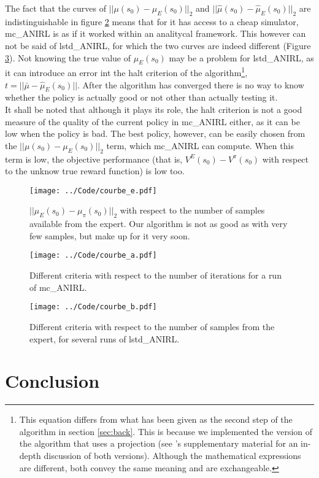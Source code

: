 \documentclass{article}
\begin{document}
The fact that  the curves of  $||\mu(s_0) - \mu_E(s_0)||_2$ and $||\hat\mu(s_0) - \hat\mu_E(s_0)||_2$ are indistinguishable in figure \ref{fig:A} means that for it has access to a cheap simulator, mc\_ANIRL is as if it worked within an analitycal framework. This however can not be said of lstd\_ANIRL, for which the two curves are indeed different (Figure \ref{fig:B}). Not knowing the true value of $\mu_E(s_0)$ may be a problem for lstd\_ANIRL, as it can introduce an error int the halt criterion of the algorithm\footnote{This equation differs from what has been given as the second step of the algorithm in section \ref{sec:back}. This is because we implemented the version of the algorithm that uses a projection (see \citet{abbeel2004apprenticeship}'s supplementary material for an in-depth discussion of both versions). Although the mathematical expressions are different, both convey the same meaning and are exchangeable.}, $t = ||\bar\mu-\hat\mu_E(s_0)||$. After the algorithm has converged there is no way to know whether the policy is actually good or not other than actually testing it.\\

It shall be noted that although it plays its role, the halt criterion is not a good measure of the quality of the current policy in mc\_ANIRL either, as it can be low when the policy is bad. The best policy, however, can be easily chosen from the $||\mu(s_0) - \mu_E(s_0)||_2$ term, which mc\_ANIRL can compute. When this term is low, the objective performance (that is, $V^E(s_0)-V^\pi(s_0)$ with respect to the unknow true reward function) is low too. 
\begin{figure}
\texttt{[image: ../Code/courbe\_e.pdf]}
\caption{$||\mu_E(s_0)-\mu_\pi(s_0)||_2$ with respect to the number of samples available from the expert. Our algorithm is not as good as \citet{abbeel2004apprenticeship} with very few samples, but make up for it very soon.}
\label{fig:E}
\end{figure}
\label{sec:perf}
\begin{figure}
\texttt{[image: ../Code/courbe\_a.pdf]}
\caption{Different criteria with respect to the number of iterations for a run of mc\_ANIRL.}
\label{fig:A}
\end{figure}
\begin{figure}
\texttt{[image: ../Code/courbe\_b.pdf]}
\caption{Different criteria with respect to the number of samples from the expert, for several runs of lstd\_ANIRL.}
\label{fig:B}
\end{figure}
\section{Conclusion}
        
\label{sec:conclusion}


\end{document}
